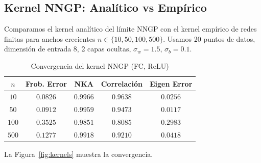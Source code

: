 
\subsection{Kernel NNGP: Analítico vs Empírico}

Comparamos el kernel analítico del límite NNGP con el kernel empírico
de redes finitas para anchos crecientes $n \in \{10, 50, 100, 500\}$.
Usamos 20 puntos de datos, dimensión de entrada 8,
2 capas ocultas, $\sigma_w=1.5$, $\sigma_b=0.1$.

\begin{table}[h]
\centering
\caption{Convergencia del kernel NNGP (FC, ReLU)}
\begin{tabular}{c|cccc}
\toprule
$n$ & Frob. Error & NKA & Correlación & Eigen Error \\
\midrule
  $10$ & $0.0826$ & $0.9966$ & $0.9638$ & $0.0256$ \\
  $50$ & $0.0912$ & $0.9959$ & $0.9473$ & $0.0117$ \\
  $100$ & $0.3525$ & $0.9851$ & $0.8085$ & $0.2983$ \\
  $500$ & $0.1277$ & $0.9918$ & $0.9210$ & $0.0418$ \\
\bottomrule
\end{tabular}
\end{table}

La Figura~\ref{fig:kernels} muestra la convergencia.